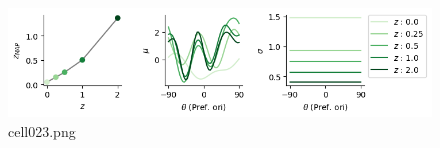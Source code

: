 \begin{figure}[ht]
	\centering
	\includegraphics[scale=0.8, max width=\linewidth]{./fig/bayesian-brain/neural-sampling/cell023.png}
	\caption{cell023.png}
	\label{cell023.png}
\end{figure}